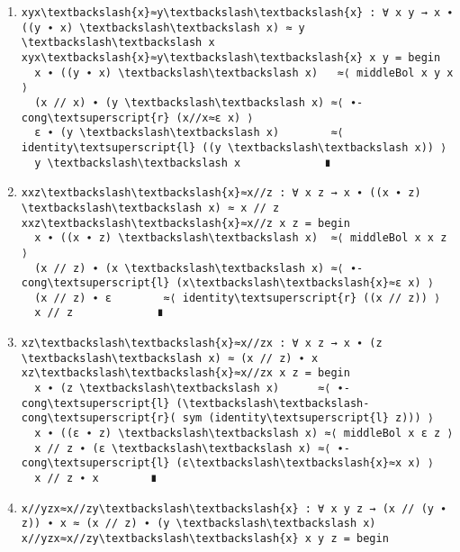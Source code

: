 \begin{enumerate}
\item
\begin{Verbatim}[commandchars=\\\{\},samepage=true]
xyx\textbackslash{x}≈y\textbackslash\textbackslash{x} : ∀ x y → x ∙ ((y ∙ x) \textbackslash\textbackslash x) ≈ y \textbackslash\textbackslash x
xyx\textbackslash{x}≈y\textbackslash\textbackslash{x} x y = begin
  x ∙ ((y ∙ x) \textbackslash\textbackslash x)   ≈⟨ middleBol x y x ⟩
  (x // x) ∙ (y \textbackslash\textbackslash x) ≈⟨ ∙-cong\textsuperscript{r} (x//x≈ε x) ⟩
  ε ∙ (y \textbackslash\textbackslash x)        ≈⟨ identity\textsuperscript{l} ((y \textbackslash\textbackslash x)) ⟩
  y \textbackslash\textbackslash x             ∎
\end{Verbatim}
\item
\begin{Verbatim}[commandchars=\\\{\},samepage=true]
xxz\textbackslash\textbackslash{x}≈x//z : ∀ x z → x ∙ ((x ∙ z) \textbackslash\textbackslash x) ≈ x // z
xxz\textbackslash\textbackslash{x}≈x//z x z = begin
  x ∙ ((x ∙ z) \textbackslash\textbackslash x)  ≈⟨ middleBol x x z ⟩
  (x // z) ∙ (x \textbackslash\textbackslash x) ≈⟨ ∙-cong\textsuperscript{l} (x\textbackslash\textbackslash{x}≈ε x) ⟩
  (x // z) ∙ ε        ≈⟨ identity\textsuperscript{r} ((x // z)) ⟩
  x // z             ∎
\end{Verbatim}
\item
\begin{Verbatim}[commandchars=\\\{\},samepage=true]
xz\textbackslash\textbackslash{x}≈x//zx : ∀ x z → x ∙ (z \textbackslash\textbackslash x) ≈ (x // z) ∙ x
xz\textbackslash\textbackslash{x}≈x//zx x z = begin
  x ∙ (z \textbackslash\textbackslash x)      ≈⟨ ∙-cong\textsuperscript{l} (\textbackslash\textbackslash-cong\textsuperscript{r}( sym (identity\textsuperscript{l} z))) ⟩
  x ∙ ((ε ∙ z) \textbackslash\textbackslash x) ≈⟨ middleBol x ε z ⟩
  x // z ∙ (ε \textbackslash\textbackslash x) ≈⟨ ∙-cong\textsuperscript{l} (ε\textbackslash\textbackslash{x}≈x x) ⟩
  x // z ∙ x        ∎
\end{Verbatim}
\item
\begin{Verbatim}[commandchars=\\\{\},samepage=true]
x//yzx≈x//zy\textbackslash\textbackslash{x} : ∀ x y z → (x // (y ∙ z)) ∙ x ≈ (x // z) ∙ (y \textbackslash\textbackslash x)
x//yzx≈x//zy\textbackslash\textbackslash{x} x y z = begin

\end{Verbatim}
\end{enumerate}
